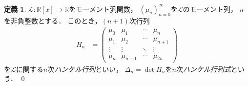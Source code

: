 \documentclass{jlreq}
\theoremstyle{definition}
\newtheorem{definition}[theorem]{定義}
\newcommand{\functype}[3]{#1\colon#2\longrightarrow#3}
\newcommand{\mcL}{\mathcal{L}}
\newcommand{\polynoms}[2]{#1[#2]}
\newcommand{\realnums}{\mathbb{R}}
\newcommand{\sequence}[3]{\sequenceparen{#1}{#2}{#3}{(}{)}} %
\newcommand{\sequenceparen}[5]{{#4#1#5}_{#2}^{#3}}
\begin{document}
\begin{definition}
  \(\functype{\mcL}{\polynoms{\realnums}{x}}{\realnums}\)をモーメント汎関数，
  \(\sequence{\mu_n}{n=0}{\infty}\)を\(\mcL\)のモーメント列，
  \(n\)を非負整数とする．
  このとき，\((n+1)\)次行列
  \begin{align}
    H_n
    &=
    \begin{pmatrix}
      \mu_0 & \mu_1 & \cdots & \mu_n \\
      \mu_1 & \mu_2 & \cdots & \mu_{n+1} \\
      \vdots & \vdots & \ddots & \vdots \\
      \mu_n & \mu_{n+1} & \cdots & \mu_{2n}
    \end{pmatrix}
  \end{align}
  を\(\mcL\)に関する\(n\)次\emph{ハンケル行列}といい，
  \(\Delta_n=\det H_n\)を\(n\)次\emph{ハンケル行列式}という．
  \qed
\end{definition}
\end{document}
